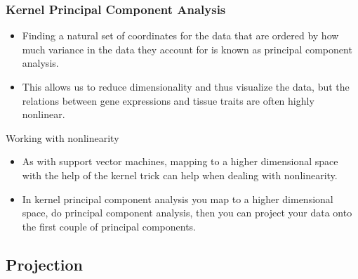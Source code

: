 \documentclass[serif]{beamer}
\begin{document}
	\begin{frame}[t]
	\frametitle{Kernel Principal Component Analysis}
		\begin{itemize}
		\item
		 Finding a natural set of coordinates for the data
		 that are ordered by how much variance in the data
		 they account for is known as principal component
		 analysis. 
		\item
		 This allows us to reduce dimensionality and thus
		 visualize the data, but the relations between
		 gene expressions and tissue traits are often
		 highly nonlinear.
		\end{itemize}
		\begin{block}{Working with nonlinearity}
		 \begin{itemize}
		 \item
		   As with support vector machines, mapping to a
		   higher dimensional space with the help of the
		   kernel trick can help when dealing with 
		   nonlinearity.
		 \item
		   In kernel principal component analysis you map
		   to a higher dimensional space, do principal 
		   component analysis, then you can project your
		   data onto the first couple of principal 
		   components.
		 \end{itemize}                             
		\end{block}
		\end{frame}
		
			\subsection{Projection}
\end{document}
